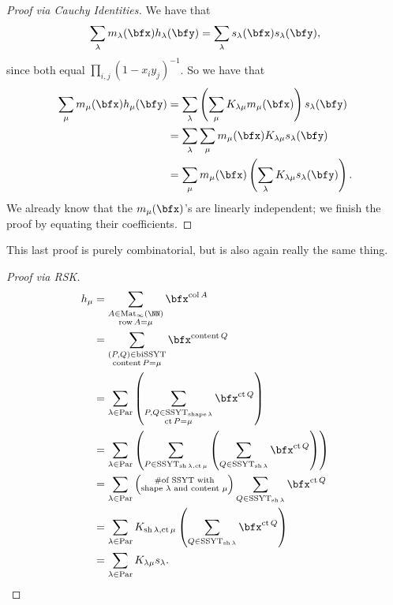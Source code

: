 \documentclass{article}
\DeclareMathOperator{\row}{row}
\DeclareMathOperator{\col}{col}
\DeclareMathOperator{\shape}{shape}
\DeclareMathOperator{\sh}{sh}
\DeclareMathOperator{\content}{content}
\DeclareMathOperator{\ct}{ct}
\DeclareMathOperator{\Par}{Par}
\DeclareMathOperator{\SSYT}{SSYT}
\DeclareMathOperator{\biSSYT}{biSSYT}
\DeclareMathOperator{\Mat}{Mat}
\begin{document}
\begin{proof}[Proof via Cauchy Identities]
    We have that
    \[
        \sum_\lambda 
        m_\lambda(\bfx) h_\lambda(\bfy) 
        = 
        \sum_\lambda 
        s_\lambda(\bfx) s_\lambda(\bfy),
    \]
    since both equal $\prod_{i,j}(1-x_iy_j)^{-1}$.
    So we have that
    \begin{align*}
        \sum_\mu 
        m_\mu(\bfx)h_\mu(\bfy) 
        &= 
        \sum_\lambda 
        \left( 
            \sum_\mu K_{\lambda\mu} m_\mu(\bfx) 
        \right) 
        s_\lambda(\bfy) 
        \\
        &= 
        \sum_\lambda \sum_\mu 
        m_\mu(\bfx) K_{\lambda\mu} s_\lambda(\bfy) \\
        &= 
        \sum_\mu 
        m_\mu(\bfx) 
        \left(\sum_\lambda K_{\lambda\mu} s_\lambda(\bfy)\right).
    \end{align*}
    We already know that the $m_\mu(\bfx)$'s are linearly independent; we finish the proof by equating their coefficients.
\end{proof}

This last proof is purely combinatorial, but is also again really the same thing. 

\begin{proof}[Proof via RSK]
    \begin{align*}
        h_\mu 
        &= 
        \sum_{\substack{A\in\Mat_\infty(\NN)\\\row A=\mu}} 
        \bfx^{\col A}
        \\
        &=
        \sum_{\substack{(P,Q)\in\biSSYT\\\content P=\mu}} 
        \bfx^{\content Q}
        \\
        &=
        \sum_{\lambda\in\Par}
        \left(
            \sum_{\substack{P,Q\in\SSYT_{\shape \lambda}\\\ct P=\mu}} 
            \bfx^{\ct Q}
        \right)
        \\
        &=
        \sum_{\lambda\in\Par}
        \left(
            \sum_{P\in\SSYT_{\sh \lambda, \ct \mu}} 
            \left(
                \sum_{Q\in\SSYT_{\sh \lambda}} \bfx^{\ct Q}
            \right)
        \right) 
        \\
        &=
        \sum_{\lambda\in\Par}
        \left(
            \substack{\#\text{of SSYT with}\\\text{shape $\lambda$ and content $\mu$}}
        \right)
        \sum_{Q\in\SSYT_{\sh \lambda}} 
        \bfx^{\ct Q} 
        \\
        &= 
        \sum_{\lambda\in\Par} 
        K_{\sh\lambda,\ct\mu} 
        \left(\sum_{Q\in\SSYT_{\sh \lambda}} \bfx^{\ct Q}\right) 
        \\
        &= \sum_{\lambda\in\Par} K_{\lambda\mu} s_\lambda.
    \end{align*}
\end{proof}
\end{document}
